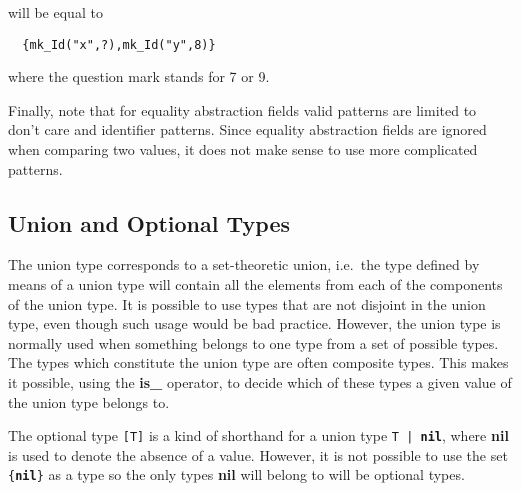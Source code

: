 \documentclass{overturerepchap}
\newcommand{\keyw}[1]{{\bf\ttfamily #1}}
\begin{document}
\begin{description}
will be equal to

\begin{lstlisting}
  {mk_Id("x",?),mk_Id("y",8)}
\end{lstlisting}

where the question mark stands for 7 or 9.

Finally, note that for equality abstraction fields valid patterns are
limited to don't care and identifier patterns. Since equality
abstraction fields are ignored when comparing two values, it does not
make sense to use more complicated patterns.
\end{description}

\subsection{Union and Optional Types}\label{unions}

The union type corresponds to a set-theoretic union, i.e.\ the type
defined by means of a union type will contain all the elements from
each of the components of the union type. It is possible to use types
that are not disjoint in the union type, even though such usage
would be bad practice.  However, the union type is normally used when
something belongs to one type from a set of possible types.  The
types which constitute the union type are often composite types.  This
makes it possible, using the \keyw{is\_} operator, to decide which of
these types a given value of the union type belongs to.

The optional type {\tt [T]} is a kind of shorthand for a union type {\tt T |
  \keyw{nil}}, where \keyw{nil} is used to denote the absence of a
value. However, it is not possible to use the set {\tt \{\keyw{nil}\}}
as a type so the only types \keyw{nil} will belong to will be optional
types.
\end{document}
